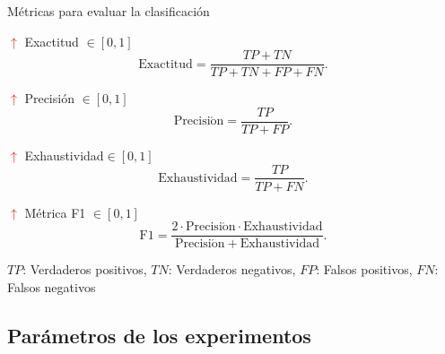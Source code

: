 \documentclass[aspectratio=169,t,xcolor=table]{beamer}
\begin{document}
\begin{frame}{Métricas para evaluar la clasificación}
    \centering
    \scriptsize \vspace{-0.5cm}
    \begin{block}{\scriptsize {\small \textcolor{red}{$\uparrow$}} Exactitud $ \in [0,1]$}
        \begin{equation*}
            \mathrm{Exactitud} = \frac{TP+TN}{TP+TN+FP+FN}.
        \end{equation*}
    \end{block}
    \begin{block}{\scriptsize {\small \textcolor{red}{$\uparrow$}} Precisión $ \in [0,1]$}
        \begin{equation*}
            \mathrm{Precisi\acute{o}n} = \frac{TP}{TP+FP}.
        \end{equation*}
    \end{block}
    \begin{block}{\scriptsize {\small \textcolor{red}{$\uparrow$}} Exhaustividad$ \in [0,1]$}
        \begin{equation*}
            \mathrm{Exhaustividad} = \frac{TP}{TP+FN}.
        \end{equation*}
    \end{block}
    \begin{block}{\scriptsize {\small \textcolor{red}{$\uparrow$}} Métrica F1 $\in [0,1]$}
        \begin{equation*}
            \mathrm{F1} = \frac{2\cdot\mathrm{Precisi\acute{o}n}\cdot\mathrm{Exhaustividad}}{\mathrm{Precisi\acute{o}n}+\mathrm{Exhaustividad}}.
        \end{equation*}
    \end{block}
    \vfill
    
    $TP$: Verdaderos positivos, \quad $TN$: Verdaderos negativos, \quad $FP$: Falsos positivos, \quad $FN$: Falsos negativos
\end{frame}

\subsection{Parámetros de los experimentos}
\end{document}
